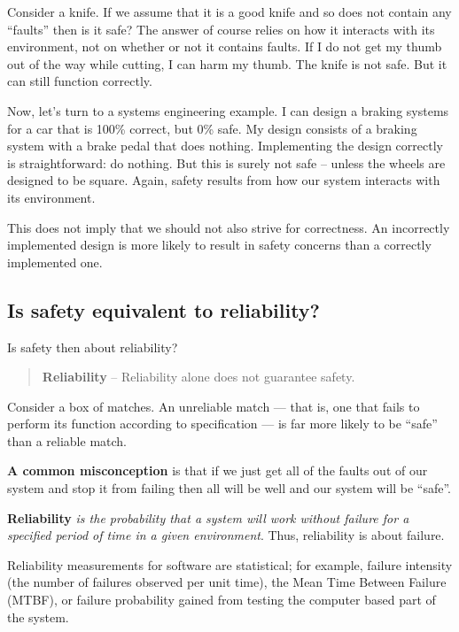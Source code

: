 Consider a knife. If we assume that it is a good knife and so does not contain any ``faults'' then is it safe? The answer of course relies on how it interacts with its environment, not on whether or not it contains faults. If I do not get my thumb out of the way while cutting, I can harm my thumb. The knife is not safe. But it can still function correctly.

Now, let's turn to a systems engineering example. I can design a braking systems for a car that is 100\% correct, but 0\% safe. My design consists of a braking system with a brake pedal that does nothing. Implementing the design correctly is straightforward: do nothing. But this is surely not safe -- unless the wheels are designed to be square. Again, safety results from how our system interacts with its environment.

This does not imply that we should not also strive for correctness. An incorrectly implemented design is more likely to result in safety concerns than a correctly implemented one.

\subsection*{Is safety equivalent to reliability?}

Is safety then about reliability?

\begin{quote}
  \textbf{Reliability} -- Reliability alone does not guarantee safety.
\end{quote}


Consider a box of matches. An unreliable match --- that is, one that fails to perform its function according to specification --- is far more likely to be ``safe'' than a reliable match.

  \textbf{A common misconception} is that if we just get all of the
  faults out of our system and stop it from failing then all will be
  well and our system will be ``safe''.

  \textbf{Reliability} {\em is the probability that a system will work without failure for a specified period of time in a given environment}. Thus, reliability is about failure.

  Reliability measurements for software are statistical; for example,
  failure intensity (the number of failures observed per unit
  time), the Mean Time Between Failure (MTBF), or failure
    probability gained from testing the computer based part of the
  system.

